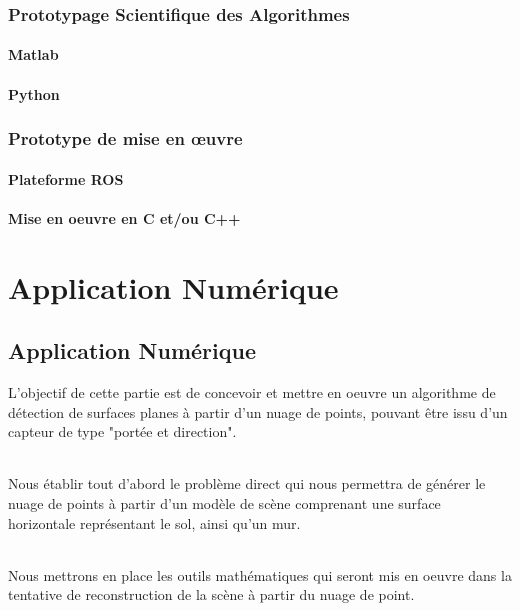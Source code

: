 \documentclass[12pt,a4paper]{report}
\begin{document}
\section{Prototypage Scientifique des Algorithmes}
\subsection{Matlab}
\subsection{Python}
\section{Prototype de mise en œuvre}
\subsection{Plateforme ROS}
\subsection{Mise en oeuvre en C et/ou C++}

\part{Application Numérique}

\chapter{Application Numérique}
L'objectif de cette partie est de concevoir et mettre en oeuvre un algorithme de détection de surfaces planes à partir d'un nuage de points, pouvant être issu d'un capteur de type "portée et direction".

\paragraph{} Nous établir tout d'abord le problème direct qui nous permettra de générer le nuage de points à partir d'un modèle de scène comprenant une surface horizontale représentant le sol, ainsi qu'un mur.

\paragraph{} Nous mettrons en place les outils mathématiques qui seront mis en oeuvre dans la tentative de reconstruction de la scène à partir du nuage de point.
\end{document}

